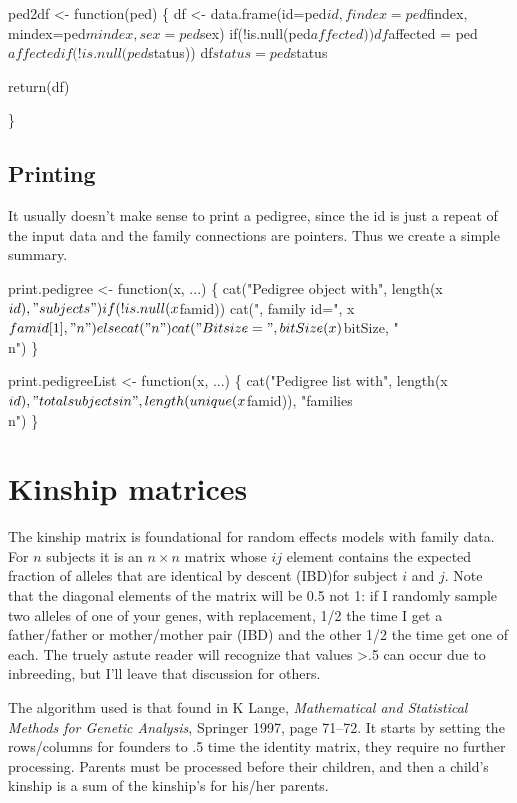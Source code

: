 \documentclass{article}
\begin{document}
\nwenddocs{}\endmoddef

ped2df <- function(ped) \{
  df <- data.frame(id=ped$id, findex=ped$findex, mindex=ped$mindex, sex=ped$sex)
  if(!is.null(ped$affected))
    df$affected = ped$affected

  if(!is.null(ped$status))
    df$status = ped$status

  return(df)

\}

\nwendcode{}\nwdocspar



\subsection{Printing}
It usually doesn't make sense to print a pedigree, since the id is just   %
a repeat of the input data and the family connections are pointers.
Thus we create a simple summary.

\nwenddocs{}\endmoddef
print.pedigree <- function(x, ...) \{
    cat("Pedigree object with", length(x$id), "subjects")
    if (!is.null(x$famid)) cat(", family id=", x$famid[1], "\\n")
    else cat("\\n")
    cat("Bit size=", bitSize(x)$bitSize, "\\n")
    \}

print.pedigreeList <- function(x, ...) \{
    cat("Pedigree list with", length(x$id), "total subjects in",
        length(unique(x$famid)), "families\\n")
    \}
\nwendcode{}\nwdocspar
\section{Kinship matrices}
The kinship matrix is foundational for random effects models with family
data.  
For $n$ subjects it is an $n \times n$ matrix whose $ij$ element contains
the expected fraction of alleles that are identical by descent (IBD)for subject
$i$ and $j$.
Note that the diagonal elements of the matrix will be 0.5 not 1: if I randomly
sample two alleles of one of your genes, with replacement, 1/2 the time I get
a father/father or mother/mother pair (IBD) and the other 1/2 the time get
one of each.  
The truely astute reader will recognize that values >.5 can occur due to
inbreeding, but I'll leave that discussion for others.                    %

The algorithm used is that found in K Lange, 
\emph{Mathematical and Statistical  Methods for Genetic Analysis}, 
Springer 1997, page 71--72.
It starts by setting the rows/columns for founders to .5 time the identity
matrix, they require no further processing.  
Parents must be processed before their children, and then a child's        %
kinship is a sum of the kinship's for his/her parents.                     %
\end{document}

